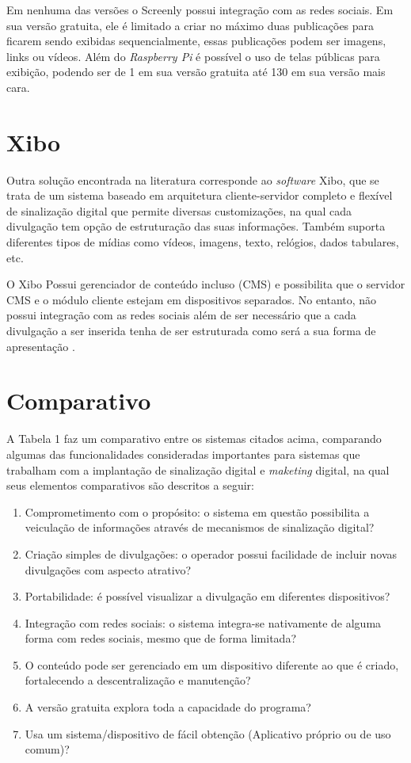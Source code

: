 Em nenhuma das versões o Screenly possui integração com as redes sociais. Em sua versão gratuita, ele é limitado a criar no máximo duas publicações para ficarem sendo exibidas sequencialmente, essas publicações podem ser imagens, links ou vídeos. Além do \textit{Raspberry Pi} é possível o uso de telas públicas para exibição, podendo ser de 1 em sua versão gratuita até 130 em sua versão mais cara.

\section{Xibo}
Outra solução encontrada na literatura corresponde ao \textit{software} Xibo, que se trata de um sistema baseado em arquitetura cliente-servidor completo e flexível de sinalização digital que permite diversas customizações, na qual cada divulgação tem opção de estruturação das suas informações. Também suporta diferentes tipos de mídias como vídeos, imagens, texto, relógios, dados tabulares, etc. 

O Xibo Possui gerenciador de conteúdo incluso (CMS) e possibilita que o servidor CMS e o módulo cliente estejam em dispositivos separados. No entanto, não possui integração com as redes sociais além de ser necessário que a cada divulgação a ser inserida tenha de ser estruturada como será a sua forma de apresentação \cite{xibo2017}.

\section{Comparativo}
A Tabela 1 faz um comparativo entre os sistemas citados acima, comparando algumas das funcionalidades consideradas importantes para sistemas que trabalham com a implantação de sinalização digital e \textit{maketing} digital, na qual seus elementos comparativos são descritos a seguir:
\begin{enumerate}[label=\Roman*)]
	\item Comprometimento com o propósito: o sistema em questão possibilita a veiculação de informações através de mecanismos de sinalização digital?
	\item Criação simples de divulgações: o operador possui facilidade de incluir novas divulgações com aspecto atrativo?
	\item Portabilidade: é possível visualizar a divulgação em diferentes dispositivos?
	\item Integração com redes sociais: o sistema integra-se nativamente de alguma forma com redes sociais, mesmo que de forma limitada?
	\item O conteúdo pode ser gerenciado em um dispositivo diferente ao que é criado, fortalecendo a descentralização e manutenção?
	\item A versão gratuita explora toda a capacidade do programa?
	\item Usa um sistema/dispositivo de fácil obtenção (Aplicativo próprio ou de uso comum)?
\end{enumerate}

